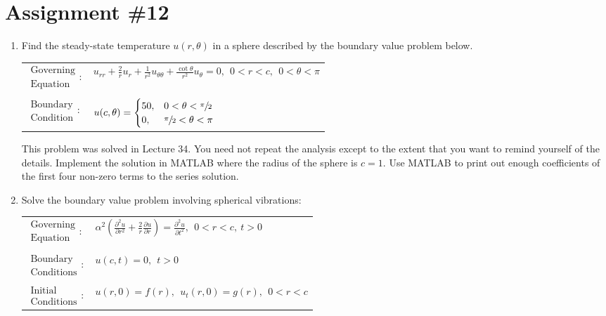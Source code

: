 \chapter{Assignment \#12}
\label{ch:ass12}
\begin{fullwidth}

\begin{enumerate}

\item Find the steady-state temperature $u(r,\theta)$ in a sphere described by the boundary value problem below.

\begin{table}[h!]
\begin{tabular}{l l}
$\substack{\text{Governing} \\\text{Equation}}: $& $u_{rr} + \frac{2}{r}u_r + \frac{1}{r^2}u_{\theta \theta} + \frac{\cot{\theta}}{r^2}u_{\theta} = 0, \ \ 0<r<c, \ \ 0<\theta < \pi$ \\
& \\
$\substack{\text{Boundary} \\ \text{Condition}}: $& $u(c,\theta)= \begin{cases} 50, & 0 < \theta < \sfrac{\pi}{2} \\ 0, & \sfrac{\pi}{2} < \theta < \pi \end{cases} $\\
\end{tabular}
\end{table}

\noindent This problem was solved in Lecture 34. You need not repeat the analysis except to the extent that you want to remind yourself of the details.  Implement the solution in MATLAB where the radius of the sphere is $c=1$.  Use MATLAB to print out enough coefficients of the first four non-zero terms to the series solution.


\vspace{2.0cm}

\item Solve the boundary value problem involving spherical vibrations:
\begin{table}
\begin{tabular}{l l}
$\substack{\text{Governing} \\\text{Equation}}: $& $\alpha^2\left(\frac{\partial^2 u}{\partial r^2} + \frac{2}{r}\frac{\partial u}{\partial r}\right) = \frac{\partial^2 u}{\partial t^2}, \ \ 0<r<c, \ t>0$  \\
& \\
$\substack{\text{Boundary} \\ \text{Conditions}}: $& $u(c,t)=0, \ \ t>0$\\
& \\
$\substack{\text{Initial} \\ \text{Conditions}}: $ & $u(r,0) = f(r), \ \ u_{t}(r,0) = g(r), \ \ 0<r<c $ \\
\end{tabular}
\end{table}


\end{enumerate}
\end{fullwidth}
